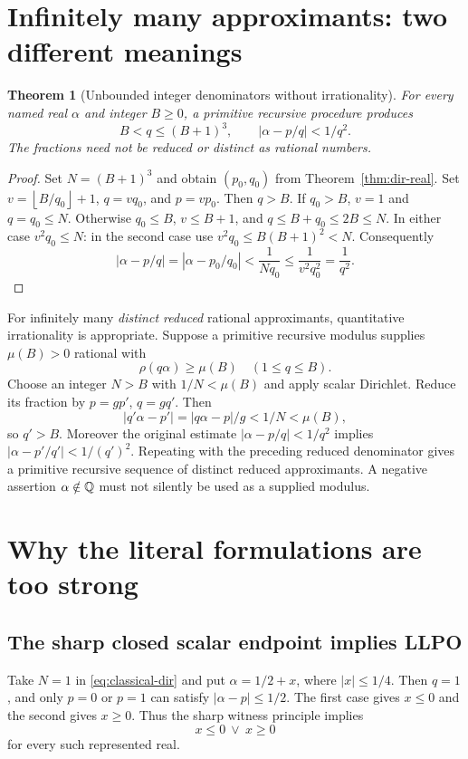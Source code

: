 \documentclass[11pt]{article}
\newtheorem{theorem}{Theorem}[section]
\theoremstyle{definition}\newtheorem{definition}[theorem]{Definition}
\theoremstyle{remark}\newtheorem{remark}[theorem]{Remark}
\newcommand{\floor}[1]{\left\lfloor#1\right\rfloor}
\begin{document}
\section{Infinitely many approximants: two different meanings}\label{sec:infinite}

\begin{theorem}[Unbounded integer denominators without irrationality]\label{thm:padding}
For every named real $\alpha$ and integer $B\ge0$, a primitive recursive procedure produces
\[
 B<q\le(B+1)^3,\qquad |\alpha-p/q|<1/q^2.
\]
The fractions need not be reduced or distinct as rational numbers.
\end{theorem}
\begin{proof}
Set $N=(B+1)^3$ and obtain $(p_0,q_0)$ from Theorem~\ref{thm:dir-real}. Set $v=\floor{B/q_0}+1$, $q=vq_0$, and $p=vp_0$. Then $q>B$. If $q_0>B$, $v=1$ and $q=q_0\le N$. Otherwise $q_0\le B$, $v\le B+1$, and $q\le B+q_0\le2B\le N$. In either case $v^2q_0\le N$: in the second case use $v^2q_0\le B(B+1)^2<N$.
Consequently
\[
 |\alpha-p/q|=|\alpha-p_0/q_0|
 <\frac1{Nq_0}\le\frac1{v^2q_0^2}=\frac1{q^2}.
\]
\end{proof}

For infinitely many \emph{distinct reduced} rational approximants, quantitative irrationality is appropriate. Suppose a primitive recursive modulus supplies $\mu(B)>0$ rational with
\[
 \rho(q\alpha)\ge\mu(B)\quad(1\le q\le B).
\]
Choose an integer $N>B$ with $1/N<\mu(B)$ and apply scalar Dirichlet. Reduce its fraction by $p=gp'$, $q=gq'$. Then
\[
 |q'\alpha-p'|=|q\alpha-p|/g<1/N<\mu(B),
\]
so $q'>B$. Moreover the original estimate $|\alpha-p/q|<1/q^2$ implies $|\alpha-p'/q'|<1/(q')^2$. Repeating with the preceding reduced denominator gives a primitive recursive sequence of distinct reduced approximants. A negative assertion $\alpha\notin\mathbb Q$ must not silently be used as a supplied modulus.

\section{Why the literal formulations are too strong}\label{sec:obstructions}

\subsection{The sharp closed scalar endpoint implies LLPO}

Take $N=1$ in \eqref{eq:classical-dir} and put $\alpha=1/2+x$, where $|x|\le1/4$. Then $q=1$, and only $p=0$ or $p=1$ can satisfy $|\alpha-p|\le1/2$. The first case gives $x\le0$ and the second gives $x\ge0$. Thus the sharp witness principle implies
\begin{equation}\label{eq:weak-linearity}
 x\le0\ \vee\ x\ge0
\end{equation}
for every such represented real.
\end{document}
